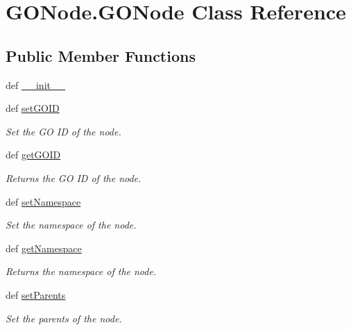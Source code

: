 \hypertarget{class_g_o_node_1_1_g_o_node}{
\section{GONode.GONode Class Reference}
\label{class_g_o_node_1_1_g_o_node}
}
\subsection*{Public Member Functions}
\begin{DoxyCompactItemize}
\item 
def \hyperlink{class_g_o_node_1_1_g_o_node_aed2500c2cbac29cc9793c37396b75928}{\_\-\_\-init\_\-\_\-}
\item 
def \hyperlink{class_g_o_node_1_1_g_o_node_a7bc51e25200c46ad8a7557992f90f7ca}{setGOID}
\begin{DoxyCompactList}\small\item\em Set the GO ID of the node. \item\end{DoxyCompactList}\item 
def \hyperlink{class_g_o_node_1_1_g_o_node_a91edd86173c3363534143762378df221}{getGOID}
\begin{DoxyCompactList}\small\item\em Returns the GO ID of the node. \item\end{DoxyCompactList}\item 
def \hyperlink{class_g_o_node_1_1_g_o_node_a0590505c8573df5ef3b6e8290e821de1}{setNamespace}
\begin{DoxyCompactList}\small\item\em Set the namespace of the node. \item\end{DoxyCompactList}\item 
def \hyperlink{class_g_o_node_1_1_g_o_node_a48bb3137f3e30d60884665022476051b}{getNamespace}
\begin{DoxyCompactList}\small\item\em Returns the namespace of the node. \item\end{DoxyCompactList}\item 
def \hyperlink{class_g_o_node_1_1_g_o_node_adf32cb452b5eff47a658d83ef9ce9381}{setParents}
\begin{DoxyCompactList}\small\item\em Set the parents of the node. \item\end{DoxyCompactList}\item 

\end{DoxyCompactItemize}
